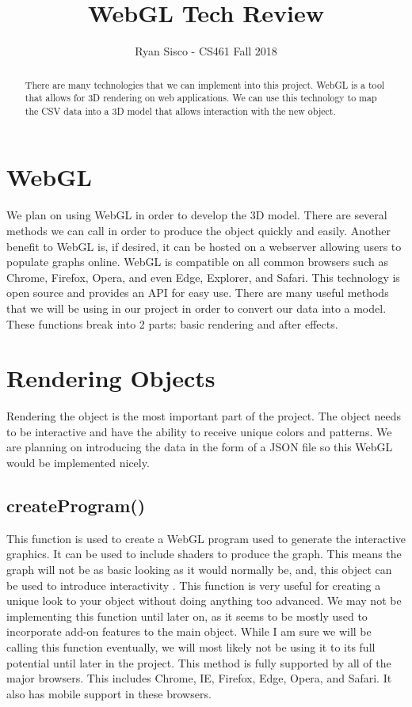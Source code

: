 \documentclass[letterpaper, 10pt] {article}
\title{WebGL Tech Review}
\author{Ryan Sisco - CS461 Fall 2018}
\begin{document}
\begin{titlingpage}
	\maketitle
	\vspace*{\fill}
	\begin{abstract}
	There are many technologies that we can implement into this project. WebGL is a tool that allows for 3D rendering on web applications. We can use this technology to map the CSV data into a 3D model that allows interaction with the new object.  
	\end{abstract}
\end{titlingpage}
\section{WebGL}
We plan on using WebGL in order to develop the 3D model. There are several methods we can call in order to produce the object quickly and easily.  Another benefit to WebGL is, if desired, it can be hosted on a webserver allowing users to populate graphs online. WebGL is compatible on all common browsers such as Chrome, Firefox, Opera, and even Edge, Explorer, and Safari.
This technology is open source and provides an API for easy use. There are many useful methods that we will be using in our project in order to convert our data into a model. These functions break into 2 parts: basic rendering and after effects.
\section{Rendering Objects}
Rendering the object is the most important part of the project. The object needs to be interactive and have the ability to receive unique colors and patterns.  We are planning on introducing the data in the form of a JSON file so this WebGL would be implemented nicely. 
\subsection{createProgram()}
This function is used to create a WebGL program used to generate the interactive graphics. It can be used to include shaders to produce the graph. This means the graph will not be as basic looking as it would normally be, and, this object can be used to introduce interactivity \cite{createprogram}.  
This function is very useful for creating a unique look to your object without doing anything too advanced. We may not be implementing this function until later on, as it seems to be mostly used to incorporate add-on features to the main object. While I am sure we will be calling this function eventually, we will most likely not be using it to its full potential until later in the project.
This method is fully supported by all of the major browsers. This includes Chrome, IE, Firefox, Edge, Opera, and Safari. It also has mobile support in these browsers. 
\end{document}
